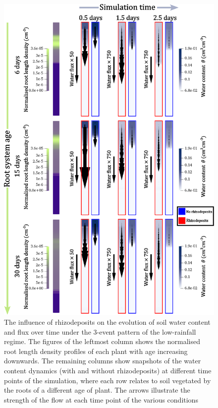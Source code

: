 \documentclass[11pt,a4paper]{article}
\numberwithin{equation}{section}
\begin{document}
\begin{figure}
	\centering
	\includegraphics[width = 0.75\linewidth, keepaspectratio]{madrid_1_event.eps}
	\caption{The influence of rhizodeposits on the evolution of soil water content and flux over time under the 3-event pattern of the low-rainfall regime. The figures of the leftmost column shows the normalised root length density profiles of each plant with age increasing downwards. The remaining columns show snapshots of the water content dynamics (with and without rhizodeposits) at different time points of the simulation, where each row relates to soil vegetated by the roots of a different age of plant. The arrows illustrate the strength of the flow at each time point of the various conditions}
	\label{figure: madrid_1_event_fluxes}
\end{figure}
\end{document}
